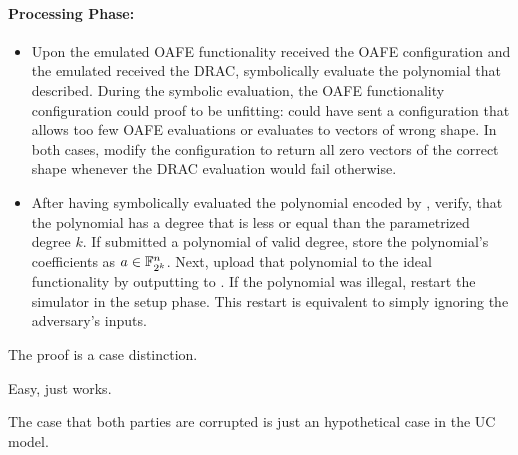 \paragraph{Processing Phase:}

\begin{itemize}

  \item Upon the emulated OAFE functionality received the OAFE configuration and
    the emulated \JWpTwo{} received the DRAC, symbolically evaluate the
    polynomial that \JWadv{} described. During the symbolic evaluation, the OAFE
    functionality configuration could proof to be unfitting: \JWadv{} could
    have sent a configuration that allows too few OAFE evaluations or evaluates
    to vectors of wrong shape. In both cases, modify the configuration to return
    all zero vectors of the correct shape whenever the DRAC evaluation would
    fail otherwise.

  \item After having symbolically evaluated the polynomial encoded by \JWadv{},
    verify, that the polynomial has a degree that is less or equal than the
    parametrized degree $k$. If \JWadv{} submitted a polynomial of valid degree,
    store the polynomial's coefficients as $a \in \mathbb{F}_{2^k}^n$.  Next,
    upload that polynomial to the ideal functionality \JWfuncSymOPEnp{} by
    outputting  to \JWfuncSymOPEnp{}.  If the polynomial
    was illegal, restart the simulator in the setup phase.  This restart is
    equivalent to simply ignoring the adversary's inputs.

\end{itemize}


%
%
\label{sec:proof}

The proof is a case distinction.




Easy, just works.





The case that both parties are corrupted is just an hypothetical case in the UC
model.



